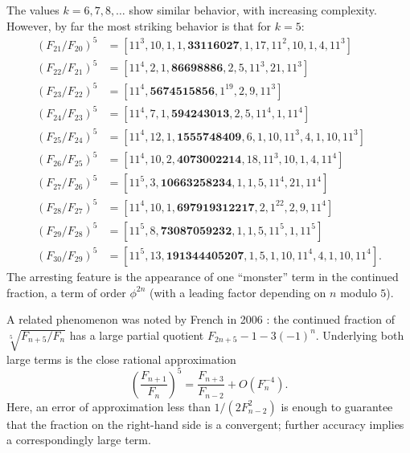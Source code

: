 \documentclass{article}
\numberwithin{equation}{section}
\theoremstyle{definition}
\theoremstyle{remark}
\newcommand{\<}{\left\langle}
\renewcommand{\>}{\right\rangle}
\begin{document}
The values $k = 6, 7, 8, \ldots$ show similar behavior, with increasing complexity. However, by far the most striking behavior is that for $k = 5$:
\begin{equation}\label{eq:fib_5_table}
  \begin{aligned}
    (F_{21}/F_{20})^5 &= [11^3,10,1,1,\mathbf{33116027},1,17,11^2,10,1,4,11^3] \\
    (F_{22}/F_{21})^5 &= [11^4,2,1,\mathbf{86698886},2,5,11^3,21,11^3] \\
    (F_{23}/F_{22})^5 &= [11^4,\mathbf{5674515856},1^{19},2,9,11^3] \\
    (F_{24}/F_{23})^5 &= [11^4,7,1,\mathbf{594243013},2,5,11^4,1,11^4] \\
    (F_{25}/F_{24})^5 &= [11^4,12,1,\mathbf{1555748409},6,1,10,11^3,4,1,10,11^3] \\
    (F_{26}/F_{25})^5 &= [11^4,10,2,\mathbf{4073002214},18,11^3,10,1,4,11^4] \\
    (F_{27}/F_{26})^5 &= [11^5,3,\mathbf{10663258234},1,1,5,11^4,21,11^4] \\
    (F_{28}/F_{27})^5 &= [11^4,10,1,\mathbf{697919312217},2,1^{22},2,9,11^4] \\
    (F_{29}/F_{28})^5 &= [11^5,8,\mathbf{73087059232},1,1,5,11^5,1,11^5] \\
    (F_{30}/F_{29})^5 &= [11^5,13,\mathbf{191344405207},1,5,1,10,11^4,4,1,10,11^4].
  \end{aligned}
\end{equation}
The arresting feature is the appearance of one
``monster'' term in the continued fraction, a term of order $\phi^{2n}$ (with a leading factor depending on $n$ modulo $5$).

A related phenomenon was noted by French in 2006 \cite{French2006}:
the continued fraction of $\sqrt[5]{F_{n+5}/F_n}$ has a large partial
quotient $F_{2n+5} - 1 - 3(-1)^n$. Underlying both large terms is the close rational approximation
\begin{equation} \label{eq:fib_5_approx}
  \left(\frac{F_{n+1}}{F_n}\right)^5 = \frac{F_{n+3}}{F_{n-2}} + O(F_n^{-4}).
\end{equation}
Here, an error of approximation less than $1/(2 F_{n-2}^2)$ is enough to guarantee that the fraction on the right-hand side is a convergent; further accuracy implies a correspondingly large term.
\end{document}
